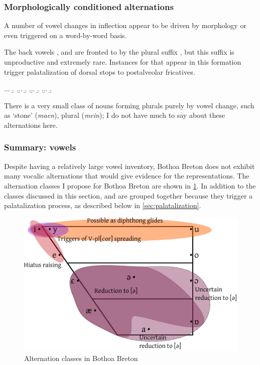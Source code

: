\subsubsection{Morphologically conditioned alternations}
\label{sec:morph-cond-altern}

A number of vowel changes in inflection appear to be driven by morphology or even triggered on a word-by-word basis.

The back vowels \ipa{[a]}, \ipa{[ɔ]} and \ipa{[ã]} are fronted to \ipa{[i]} by the plural suffix , but this suffix is unproductive and extremely rare. Instances for \ipa{[i]} that appear in this formation trigger palatalization of dorsal stops to postalveolar fricatives.

\ex.\a.\a.
\b.
\z.\b.\a.
\b.
\z.\b.\a.
\b.
\z.\b.\a.
\b.

There is a very small class of nouns forming plurals purely by vowel change, such as \ipa{[ˈmiːn]} `stone' (\emph{maen}), plural \ipa{[ˈməin]} (\emph{mein}); I do not have much to say about these alternations here.

\subsubsection{Summary: vowels}
\label{sec:summary:-vowels}

Despite having a relatively large vowel inventory, Bothoa Breton does not exhibit many vocalic alternations that would give evidence for the representations. The alternation classes I propose for Bothoa Breton are shown in \cref{fig:alt-classes-bothoa}. In addition to the classes discussed in this section, \ipa{[i]} and \ipa{[y]} are grouped together because they trigger a palatalization process, as described below in \cref{sec:palatalization}.
\begin{figure}[htp]
  \centering
  \includegraphics[width=.7\textwidth]{graphics/vowelcharts/bothoa-oral-vowels-classes}
  \caption{Alternation classes in Bothoa Breton}
  \label{fig:alt-classes-bothoa}
\end{figure}


